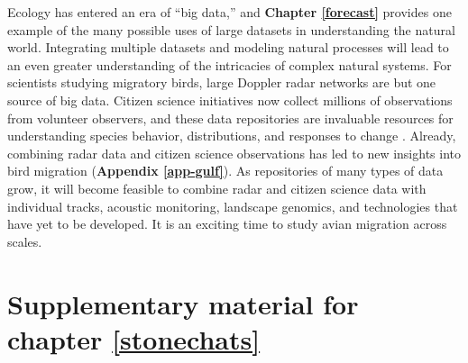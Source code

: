 \documentclass[a4paper, nobind]{templates/ociamthesis}
\begin{document}
Ecology has entered an era of ``big data,'' and \textbf{Chapter \ref{forecast}} provides one example of the many possible uses of large datasets in understanding the natural world. Integrating multiple datasets and modeling natural processes will lead to an even greater understanding of the intricacies of complex natural systems. For scientists studying migratory birds, large Doppler radar networks are but one source of big data. Citizen science initiatives now collect millions of observations from volunteer observers, and these data repositories are invaluable resources for understanding species behavior, distributions, and responses to change \autocite[e.g.~][]{sullivanEBirdEnterpriseIntegrated2014}. Already, combining radar data and citizen science observations has led to new insights into bird migration (\textbf{Appendix \ref{app-gulf}}). As repositories of many types of data grow, it will become feasible to combine radar and citizen science data with individual tracks, acoustic monitoring, landscape genomics, and technologies that have yet to be developed. It is an exciting time to study avian migration across scales.

\printbibliography[segment=\therefsection,heading=subbibliography]

\startappendices

\hypertarget{app-stonechats-supp}{%
\chapter{Supplementary material for chapter \ref{stonechats}}\label{app-stonechats-supp}}

\newpage
\end{document}
